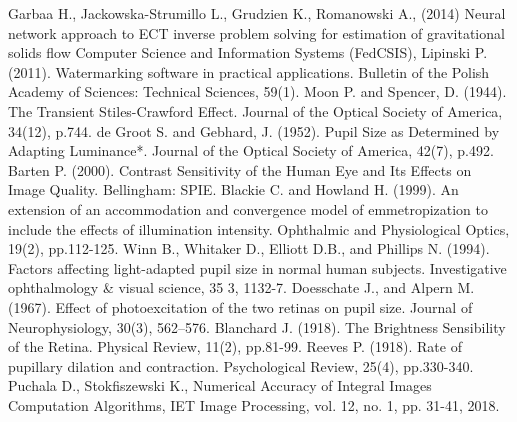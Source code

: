 \documentclass[USenglish,twocolumn]{article}
\begin{document}
\begin{thebibliography}{99}
Garbaa H., Jackowska-Strumillo L., Grudzien  K., Romanowski A., (2014) Neural network approach to ECT inverse problem solving for estimation of gravitational solids flow Computer Science and Information Systems (FedCSIS),
Lipinski P. (2011). Watermarking software in practical applications. Bulletin of the Polish Academy of Sciences: Technical Sciences, 59(1).
Moon P. and Spencer, D. (1944). The Transient Stiles-Crawford Effect. Journal of the Optical Society of America, 34(12), p.744.
de Groot S. and Gebhard, J. (1952). Pupil Size as Determined by Adapting Luminance*. Journal of the Optical Society of America, 42(7), p.492.
Barten P. (2000). Contrast Sensitivity of the Human Eye and Its Effects on Image Quality. Bellingham: SPIE.
Blackie C. and Howland H. (1999). An extension of an accommodation and convergence model of emmetropization to include the effects of illumination intensity. Ophthalmic and Physiological Optics, 19(2), pp.112-125.
Winn B., Whitaker D., Elliott D.B., and Phillips N. (1994). Factors affecting light-adapted pupil size in normal human subjects. Investigative ophthalmology \& visual science, 35 3, 1132-7.
Doesschate J., and Alpern M. (1967). Effect of photoexcitation of the two retinas on pupil size. Journal of Neurophysiology, 30(3), 562–576.
Blanchard J. (1918). The Brightness Sensibility of the Retina. Physical Review, 11(2), pp.81-99.
Reeves P. (1918). Rate of pupillary dilation and contraction. Psychological Review, 25(4), pp.330-340.
Puchala D., Stokfiszewski K., Numerical Accuracy of Integral Images
Computation Algorithms, IET Image Processing, vol. 12, no. 1, pp. 31-41,
2018.

\end{thebibliography}
\end{document}
